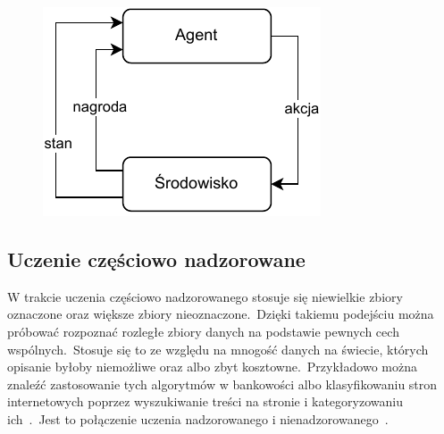 \begin{figure}[H]
    \centering
    \includegraphics[width=\textwidth]{images/reinforcemen}
    \label{fig:reinforcemenet}
\end{figure}

\pagebreak

\subsection{Uczenie częściowo nadzorowane}
W trakcie uczenia częściowo nadzorowanego stosuje się niewielkie zbiory oznaczone oraz większe zbiory nieoznaczone.\ Dzięki takiemu podejściu można próbować rozpoznać rozległe zbiory danych na podstawie pewnych cech wspólnych.\ Stosuje się to ze względu na mnogość danych na świecie, których opisanie byłoby niemożliwe oraz albo zbyt kosztowne.\ Przykładowo można znaleźć zastosowanie tych algorytmów w bankowości albo klasyfikowaniu stron internetowych poprzez wyszukiwanie treści na stronie i kategoryzowaniu ich~\cite{semiLinkedin}.\ Jest to połączenie uczenia nadzorowanego i nienadzorowanego~\cite{Mahesh2018}.


